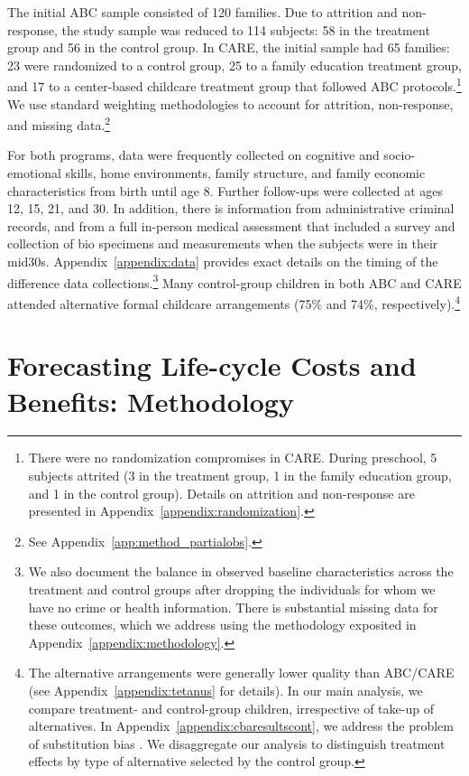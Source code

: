The initial ABC sample consisted of 120 families. Due to attrition and non-response, the study sample was reduced to 114 subjects: 58 in the treatment group and 56 in the control group. In CARE, the initial sample had 65 families: 23 were randomized to a control group, 25 to a family education treatment group, and 17 to a center-based childcare treatment group that followed ABC protocols.\footnote{There were no randomization compromises in CARE. During preschool, 5 subjects attrited (3 in the treatment group, 1 in the family education group, and 1 in the control group). Details on attrition and non-response are presented in Appendix~\ref{appendix:randomization}.} We use standard weighting methodologies to account for attrition, non-response, and missing data.\footnote{See Appendix~\ref{app:method_partialobs}.}

For both programs, data were frequently collected on cognitive and socio-emotional skills, home environments, family structure, and family economic characteristics from birth until age 8. Further follow-ups were collected at ages 12, 15, 21, and 30. In addition, there is information from administrative criminal records, and from a full in-person medical assessment that included a survey and collection of bio specimens and measurements when the subjects were in their mid30s. Appendix~\ref{appendix:data} provides exact details on the timing of the difference data collections.\footnote{We also document the balance in observed baseline characteristics across the treatment and control groups after dropping the individuals for whom we have no crime or health information. There is substantial missing data for these outcomes, which we address using the methodology exposited in Appendix~\ref{appendix:methodology}.} Many control-group children in both ABC and CARE attended alternative formal childcare arrangements (75\% and 74\%, respectively).\footnote{The alternative arrangements were generally lower quality than ABC/CARE (see Appendix~\ref{appendix:tetanus} for details). In our main analysis, we compare treatment- and control-group children, irrespective of take-up of alternatives. In Appendix~\ref{appendix:cbaresultscont}, we address the problem of substitution bias \citep{Heckman_1992_randomization,Heckman_Hohmann_etal_2000_QJE,Kline_Walters_2016_QJE}. We disaggregate our analysis to distinguish treatment effects by type of alternative selected by the control group.}

\section{Forecasting Life-cycle Costs and Benefits: Methodology} \label{section:cbamethodology}

